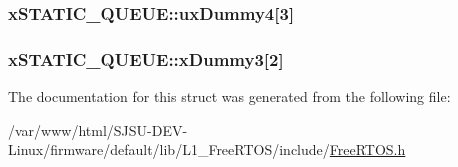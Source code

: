 \subsubsection[{\texorpdfstring{ux\+Dummy4}{uxDummy4}}]{ x\+S\+T\+A\+T\+I\+C\+\_\+\+Q\+U\+E\+U\+E\+::ux\+Dummy4\mbox{[}3\mbox{]}}\hypertarget{structxSTATIC__QUEUE_a502854697731754ce445f6503d14b127}{}\label{structxSTATIC__QUEUE_a502854697731754ce445f6503d14b127}
\subsubsection[{\texorpdfstring{x\+Dummy3}{xDummy3}}]{ x\+S\+T\+A\+T\+I\+C\+\_\+\+Q\+U\+E\+U\+E\+::x\+Dummy3\mbox{[}2\mbox{]}}\hypertarget{structxSTATIC__QUEUE_add0de93e08b632124122850bcd543597}{}\label{structxSTATIC__QUEUE_add0de93e08b632124122850bcd543597}


The documentation for this struct was generated from the following file\+:\begin{DoxyCompactItemize}
\item 
/var/www/html/\+S\+J\+S\+U-\/\+D\+E\+V-\/\+Linux/firmware/default/lib/\+L1\+\_\+\+Free\+R\+T\+O\+S/include/\hyperlink{FreeRTOS_8h}{Free\+R\+T\+O\+S.\+h}\end{DoxyCompactItemize}
